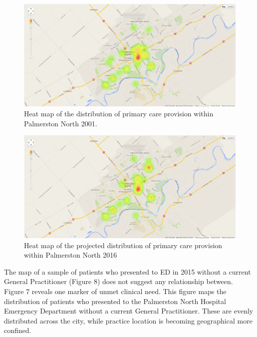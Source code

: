 \documentclass[11pt,a4paper]{article}
\begin{document}
\begin{figure}[htp]
\centering
\includegraphics[scale=0.3]{fig6.png}
\caption{Heat map of the distribution of primary care provision within Palmerston North 2001.}
\label{Heat map of practitioners 2001}
\end{figure}  

\begin{figure}[htp]
\centering
\includegraphics[scale=0.30]{fig7.png}
\caption{Heat map of the projected distribution of primary care provision within Palmerston North 2016}
\label{Heat map of the projected distribution of primary care provision within Palmerston North 2016}
\end{figure}

The map of a sample of patients who presented to ED in 2015 without a current General Practitioner (Figure 8) does not suggest any relationship between.\\

Figure 7 reveals one marker of unmet clinical need. This figure maps the distribution of patients who presented to the Palmerston North Hospital Emergency Department without a current General Practitioner. These are evenly distributed across the city, while practice location is becoming geographical more confined. \\
\end{document}
